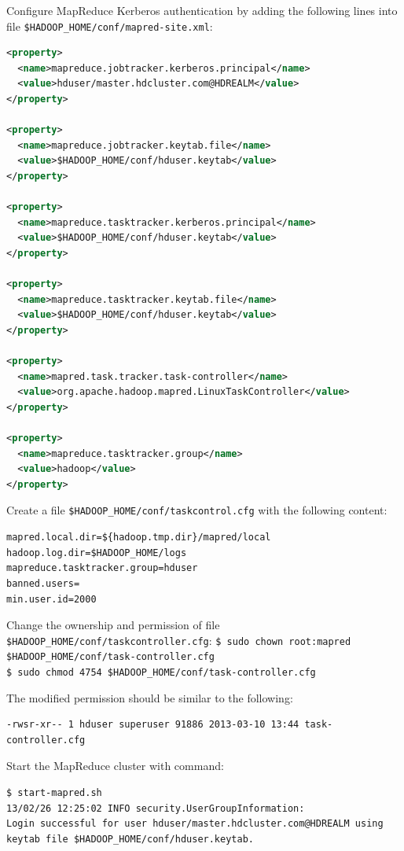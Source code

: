 Configure MapReduce Kerberos authentication by adding the following lines into file \verb|$HADOOP_HOME/conf/mapred-site.xml|:
\lstset{style=bashstyle}
\begin{lstlisting}[language=XML]
<property>
  <name>mapreduce.jobtracker.kerberos.principal</name>
  <value>hduser/master.hdcluster.com@HDREALM</value>
</property>

<property>
  <name>mapreduce.jobtracker.keytab.file</name>
  <value>$HADOOP_HOME/conf/hduser.keytab</value>
</property>

<property>
  <name>mapreduce.tasktracker.kerberos.principal</name>
  <value>$HADOOP_HOME/conf/hduser.keytab</value>
</property>

<property>
  <name>mapreduce.tasktracker.keytab.file</name>
  <value>$HADOOP_HOME/conf/hduser.keytab</value>
</property>

<property>
  <name>mapred.task.tracker.task-controller</name>
  <value>org.apache.hadoop.mapred.LinuxTaskController</value>
</property>

<property>
  <name>mapreduce.tasktracker.group</name>
  <value>hadoop</value>
</property>
\end{lstlisting}

Create a file \verb|$HADOOP_HOME/conf/taskcontrol.cfg| with the following content:
\lstset{style=bashstyle}
\begin{lstlisting}
mapred.local.dir=${hadoop.tmp.dir}/mapred/local
hadoop.log.dir=$HADOOP_HOME/logs
mapreduce.tasktracker.group=hduser
banned.users=
min.user.id=2000
\end{lstlisting}

Change the ownership and permission of file \verb|$HADOOP_HOME/conf/taskcontroller.cfg|:
\verb|$ sudo chown root:mapred $HADOOP_HOME/conf/task-controller.cfg| \\
\verb|$ sudo chmod 4754 $HADOOP_HOME/conf/task-controller.cfg|

The modified permission should be similar to the following:
\lstset{style=bashstyle}
\begin{lstlisting}
-rwsr-xr-- 1 hduser superuser 91886 2013-03-10 13:44 task-controller.cfg
\end{lstlisting}

Start the MapReduce cluster with command:
\lstset{style=bashstyle}
\begin{lstlisting}
$ start-mapred.sh
13/02/26 12:25:02 INFO security.UserGroupInformation:
Login successful for user hduser/master.hdcluster.com@HDREALM using keytab file $HADOOP_HOME/conf/hduser.keytab.
\end{lstlisting}

